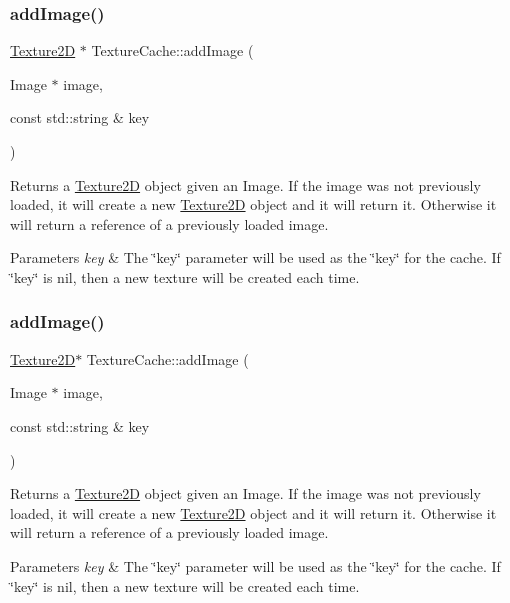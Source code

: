 \subsubsection{\texorpdfstring{add\+Image()}{addImage()}\hspace{0.1cm}{\footnotesize\ttfamily [3/4]}}
{\footnotesize\ttfamily \hyperlink{classTexture2D}{Texture2D} $\ast$ Texture\+Cache\+::add\+Image (\begin{DoxyParamCaption}\item[{Image $\ast$}]{image,  }\item[{const std\+::string \&}]{key }\end{DoxyParamCaption})}

Returns a \hyperlink{classTexture2D}{Texture2D} object given an Image. If the image was not previously loaded, it will create a new \hyperlink{classTexture2D}{Texture2D} object and it will return it. Otherwise it will return a reference of a previously loaded image. 
\begin{DoxyParams}{Parameters}
{\em key} & The \char`\"{}key\char`\"{} parameter will be used as the \char`\"{}key\char`\"{} for the cache. If \char`\"{}key\char`\"{} is nil, then a new texture will be created each time. \\
\hline
\end{DoxyParams}
\mbox{\label{classTextureCache_a6215487085c4f04c22bc03d6bce95fbe}} 
\subsubsection{\texorpdfstring{add\+Image()}{addImage()}\hspace{0.1cm}{\footnotesize\ttfamily [4/4]}}
{\footnotesize\ttfamily \hyperlink{classTexture2D}{Texture2D}$\ast$ Texture\+Cache\+::add\+Image (\begin{DoxyParamCaption}\item[{Image $\ast$}]{image,  }\item[{const std\+::string \&}]{key }\end{DoxyParamCaption})}

Returns a \hyperlink{classTexture2D}{Texture2D} object given an Image. If the image was not previously loaded, it will create a new \hyperlink{classTexture2D}{Texture2D} object and it will return it. Otherwise it will return a reference of a previously loaded image. 
\begin{DoxyParams}{Parameters}
{\em key} & The \char`\"{}key\char`\"{} parameter will be used as the \char`\"{}key\char`\"{} for the cache. If \char`\"{}key\char`\"{} is nil, then a new texture will be created each time. \\
\hline
\end{DoxyParams}
\mbox{\label{classTextureCache_a21e8506a3a65c61bef4f057ef10facba}} 
